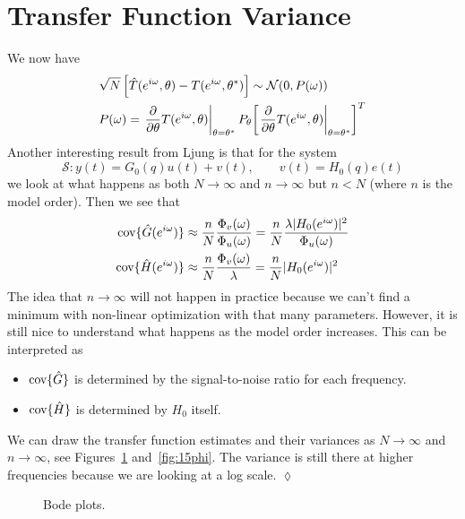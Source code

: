 \section{Transfer Function Variance}
We now have
\begin{align*}
&\sqrt{N}\left[\hat{T}(e^{i\omega},\theta) - T(e^{i\omega},\theta^\ast)\right] \sim \mathcal{N}(0,P(\omega)) \\
&P(\omega) = \left.\frac{\partial}{\partial\theta} T(e^{i\omega},\theta)\right|_{\theta=\theta^\ast} P_\theta {\left[\left.\frac{\partial}{\partial\theta}T(e^{i\omega},\theta)\right|_{\theta=\theta^\ast}\right]}^T
\end{align*}
Another interesting result from Ljung is that for the system
$$\mathcal{S}: y(t) = G_0(q)u(t)+v(t), \qquad v(t) = H_0(q)e(t)$$
we look at what happens as both $N\to\infty$ and $n\to\infty$ but $n<N$ (where $n$ is the model order).
Then we see that
\begin{align*}
\text{cov}\{\hat{G}(e^{i\omega})\} &\approx \frac{n}{N}\frac{\Phi_v(\omega)}{\Phi_u(\omega)} = \frac{n}{N}\frac{\lambda|H_0(e^{i\omega})|^2}{\Phi_u(\omega)} \\
\text{cov}\{\hat{H}(e^{i\omega})\} &\approx \frac{n}{N}\frac{\Phi_v(\omega)}{\lambda} = \frac{n}{N}|H_0(e^{i\omega})|^2
\end{align*}
The idea that $n\to\infty$ will not happen in practice because we can't find a minimum with non-linear optimization with that many parameters.
However, it is still nice to understand what happens as the model order increases.
This can be interpreted as
\begin{itemize}
\item $\text{cov}\{\hat{G}\}$ is determined by the signal-to-noise ratio for each frequency.
\item $\text{cov}\{\hat{H}\}$ is determined by $H_0$ itself.
\end{itemize}

\begin{example}
We can draw the transfer function estimates and their variances as $N\to\infty$ and $n\to\infty$, see Figures~\ref{fig:15tf} and~\ref{fig:15phi}.
The variance is still there at higher frequencies because we are looking at a log scale.
$\lozenge$
\end{example}

\begin{figure}[ht!]
\centering
{} \hfill
{}
\caption{Bode plots.}
\label{fig:15tf}
\end{figure}

